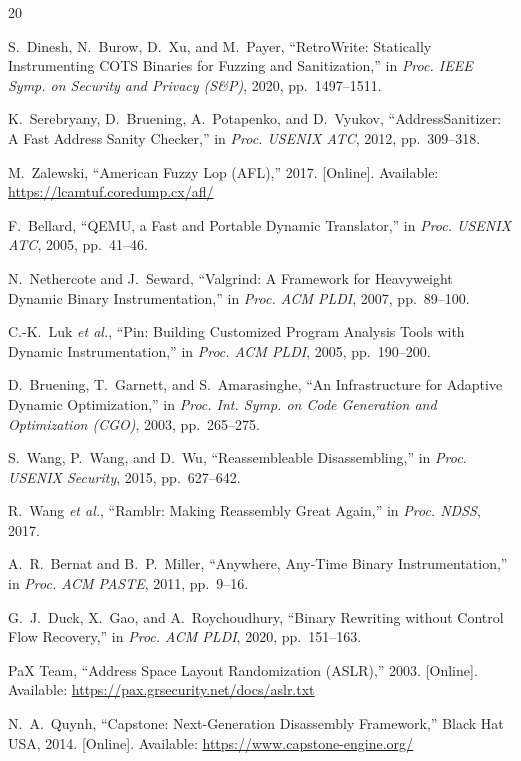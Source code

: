 \documentclass[10pt,a4paper]{article}
\begin{document}

\begin{thebibliography}{20}

S.~Dinesh, N.~Burow, D.~Xu, and M.~Payer, ``RetroWrite: Statically
Instrumenting COTS Binaries for Fuzzing and Sanitization,'' in \emph{Proc.
IEEE Symp. on Security and Privacy (S\&P)}, 2020, pp.~1497--1511.

K.~Serebryany, D.~Bruening, A.~Potapenko, and D.~Vyukov,
``AddressSanitizer: A Fast Address Sanity Checker,'' in \emph{Proc. USENIX
ATC}, 2012, pp.~309--318.

M.~Zalewski, ``American Fuzzy Lop (AFL),'' 2017. [Online]. Available:
\url{https://lcamtuf.coredump.cx/afl/}

F.~Bellard, ``QEMU, a Fast and Portable Dynamic Translator,'' in
\emph{Proc. USENIX ATC}, 2005, pp.~41--46.

N.~Nethercote and J.~Seward, ``Valgrind: A Framework for Heavyweight
Dynamic Binary Instrumentation,'' in \emph{Proc. ACM PLDI}, 2007,
pp.~89--100.

C.-K.~Luk \emph{et al.}, ``Pin: Building Customized Program Analysis Tools
with Dynamic Instrumentation,'' in \emph{Proc. ACM PLDI}, 2005,
pp.~190--200.

D.~Bruening, T.~Garnett, and S.~Amarasinghe, ``An Infrastructure for
Adaptive Dynamic Optimization,'' in \emph{Proc. Int. Symp. on Code
Generation and Optimization (CGO)}, 2003, pp.~265--275.

S.~Wang, P.~Wang, and D.~Wu, ``Reassembleable Disassembling,'' in
\emph{Proc. USENIX Security}, 2015, pp.~627--642.

R.~Wang \emph{et al.}, ``Ramblr: Making Reassembly Great Again,'' in
\emph{Proc. NDSS}, 2017.

A.~R.~Bernat and B.~P.~Miller, ``Anywhere, Any-Time Binary
Instrumentation,'' in \emph{Proc. ACM PASTE}, 2011, pp.~9--16.

G.~J.~Duck, X.~Gao, and A.~Roychoudhury, ``Binary Rewriting without
Control Flow Recovery,'' in \emph{Proc. ACM PLDI}, 2020, pp.~151--163.

PaX Team, ``Address Space Layout Randomization (ASLR),'' 2003. [Online].
Available: \url{https://pax.grsecurity.net/docs/aslr.txt}

N.~A.~Quynh, ``Capstone: Next-Generation Disassembly Framework,'' Black
Hat USA, 2014. [Online]. Available: \url{https://www.capstone-engine.org/}


\end{thebibliography}
\end{document}

